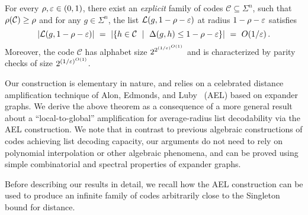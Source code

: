 \begin{corollary}
For every $\rho, \varepsilon \in (0,1)$, there exist an \emph{explicit} family of codes $\mathcal{C} \subseteq \Sigma^n$, such that $\rho({\mathcal C}) \geq \rho$ and
for any $g \in  \Sigma^n$, the list ${\mathcal L}(g,1-\rho-\varepsilon)$ at radius $1-\rho - \varepsilon$ satisfies
\[
\lvert{\mathcal L}(g,1-\rho-\varepsilon)\rvert ~=~ \lvert\left\{h \in {\mathcal C} ~\mid~ \Delta(g,h) \leq 1 - \rho - \varepsilon\right\}\rvert ~=~
O(1/\varepsilon) \,.
\]
%
Moreover,  the code $\mathcal{C}$ has alphabet size  $2^{2^{(1/\varepsilon)^{O(1)}}}$ and  is characterized by parity checks of size $2^{(1/\varepsilon)^{O(1)}}$.
%
%
\end{corollary}
%

Our construction is elementary in nature, and relies on a celebrated distance amplification technique of Alon, Edmonds, and Luby~\cite{AEL95} (AEL) based on expander graphs.
%
We derive the above theorem as a consequence of a more general result about a ``local-to-global'' amplification for average-radius list decodability via the AEL construction.
%
We note that in contrast to previous algebraic constructions of codes achieving list decoding
capacity, our arguments do not need to rely on polynomial interpolation or other algebraic
phenomena, and can be proved using simple combinatorial and spectral properties of expander graphs.

%
Before describing our results in detail, we recall how the AEL construction can be used to produce an infinite family of codes arbitrarily close to the Singleton bound for distance.
%
\vspace{-5 pt}
